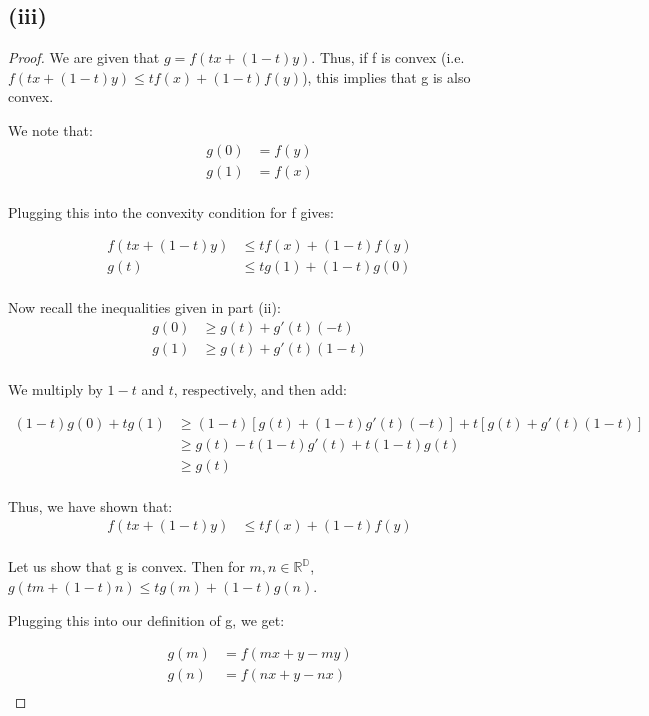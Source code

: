 \documentclass[twoside,11pt]{homework}
\begin{document}
\subsection{(iii)}
\begin{proof}
	We are given that $g = f(tx+(1-t)y)$. Thus, if f is convex (i.e. $f(tx+(1-t)y)\leq tf(x)+(1-t)f(y)$), this implies that g is also convex.

	We note that:
	\begin{align*}
		g(0) &= f(y)\\
		g(1) &= f(x)\\
	\end{align*}

	Plugging this into the convexity condition for f gives:

	\begin{align*}
		f(tx+(1-t)y)&\leq tf(x)+(1-t)f(y)\\
		g(t)&\leq tg(1)+(1-t)g(0)\\
	\end{align*}

	Now recall the inequalities given in part (ii):
	\begin{align*}
	g(0) &\geq g(t) + g'(t)(-t)\\
	g(1) &\geq g(t) + g'(t)(1-t)\\
	\end{align*}

We multiply by $1-t$ and $t$, respectively, and then add:

	\begin{align*}
	(1-t)g(0)+tg(1)&\geq (1-t)[g(t) + (1-t)g'(t)(-t)]+t[g(t) + g'(t)(1-t)]\\
	 &\geq g(t) -t(1-t)g'(t)+ t(1-t)g(t)\\
	 &\geq g(t)\\
	\end{align*}

Thus, we have shown that:
\begin{align*}
	f(tx+(1-t)y)&\leq tf(x)+(1-t)f(y)\\
\end{align*}

Let us show that g is convex. Then for $m, n \in \mathbb{R^D}$, $g(tm+(1-t)n)\leq tg(m)+(1-t)g(n)$.

Plugging this into our definition of g, we get:

\begin{align*}
	g(m) &= f(mx+y-my)\\
	g(n) &= f(nx+y-nx)\\
\end{align*}


\end{proof}
\end{document}
